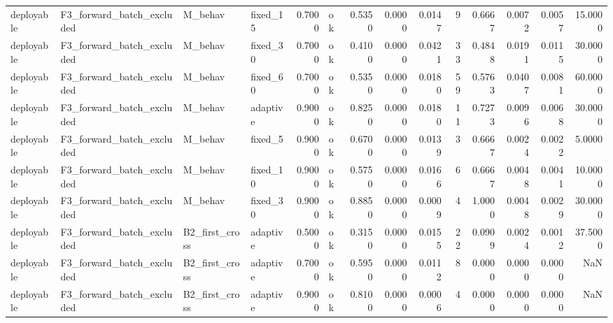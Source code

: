 \begin{table}
\begin{tabular}{llllrlrrrrrrrr}
deployable & F3\_forward\_batch\_excluded & M\_behav & fixed\_15 & 0.7000 & ok & 0.5350 & 0.0000 & 0.0147 & 9 & 0.6667 & 0.0072 & 0.0057 & 15.0000 \\
deployable & F3\_forward\_batch\_excluded & M\_behav & fixed\_30 & 0.7000 & ok & 0.4100 & 0.0000 & 0.0421 & 33 & 0.4848 & 0.0191 & 0.0115 & 30.0000 \\
deployable & F3\_forward\_batch\_excluded & M\_behav & fixed\_60 & 0.7000 & ok & 0.5350 & 0.0000 & 0.0180 & 59 & 0.5763 & 0.0407 & 0.0081 & 60.0000 \\
deployable & F3\_forward\_batch\_excluded & M\_behav & adaptive & 0.9000 & ok & 0.8250 & 0.0000 & 0.0180 & 11 & 0.7273 & 0.0096 & 0.0068 & 30.0000 \\
deployable & F3\_forward\_batch\_excluded & M\_behav & fixed\_5 & 0.9000 & ok & 0.6700 & 0.0000 & 0.0139 & 3 & 0.6667 & 0.0024 & 0.0022 & 5.0000 \\
deployable & F3\_forward\_batch\_excluded & M\_behav & fixed\_10 & 0.9000 & ok & 0.5750 & 0.0000 & 0.0166 & 6 & 0.6667 & 0.0048 & 0.0041 & 10.0000 \\
deployable & F3\_forward\_batch\_excluded & M\_behav & fixed\_30 & 0.9000 & ok & 0.8850 & 0.0000 & 0.0009 & 4 & 1.0000 & 0.0048 & 0.0029 & 30.0000 \\
deployable & F3\_forward\_batch\_excluded & B2\_first\_cross & adaptive & 0.5000 & ok & 0.3150 & 0.0000 & 0.0155 & 22 & 0.0909 & 0.0024 & 0.0012 & 37.5000 \\
deployable & F3\_forward\_batch\_excluded & B2\_first\_cross & adaptive & 0.7000 & ok & 0.5950 & 0.0000 & 0.0112 & 8 & 0.0000 & 0.0000 & 0.0000 & NaN \\
deployable & F3\_forward\_batch\_excluded & B2\_first\_cross & adaptive & 0.9000 & ok & 0.8100 & 0.0000 & 0.0006 & 4 & 0.0000 & 0.0000 & 0.0000 & NaN \\
\bottomrule
\end{tabular}
\end{table}
